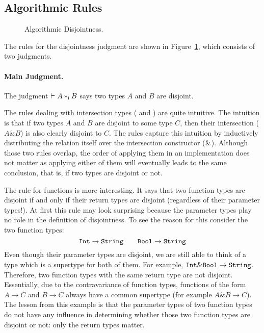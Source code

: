\subsection{Algorithmic Rules}

\begin{figure}[h]


  \caption{Algorithmic Disjointness.}
  \label{fig:disjointness}
\end{figure}

The rules for the disjointness judgment are shown in
Figure~\ref{fig:disjointness}, which consists of two judgments.

\paragraph{Main Judgment.} The judgment $\vdash A *_\textnormal{i} B$ says
two types $A$ and $B$ are disjoint.

The rules dealing with intersection types ( and
) are quite intuitive. The intuition is that if two
types $A$ and $B$ are disjoint to some type $C$, then their intersection
($A\&B$) is also clearly disjoint to $C$.  The rules capture this intuition by
inductively distributing the relation itself over the intersection constructor
($\&$). Although those two rules overlap, the order of applying them in an
implementation does not matter as applying either of them will eventually leads
to the same conclusion, that is, if two types are disjoint or not.

The rule for functions  is more interesting. It says that two function
types are disjoint if and only if their return types are disjoint (regardless of
their parameter types!). At first this rule may look surprising
because the parameter types play no role in the definition of
disjointness. To see the reason for this consider the two function types:
\[ \texttt{Int} \to \texttt{String} \qquad \texttt{Bool} \to \texttt{String} \]
Even though their parameter types are disjoint, we are still able to think of a
type which is a supertype for both of them. For example, $ \texttt{Int} \& \texttt{Bool}
\to \texttt{String} $. Therefore, two function types with
the same return type are not
disjoint. Essentially, due to the contravariance of function types,
functions of the form $A \to C$ and $B \to C$ always have a common
supertype (for example $A \& B \to C$).
The lesson from this example is that the parameter types of two
function types do not have any influence in determining whether those two function
types are disjoint or not: only the return types matter.

